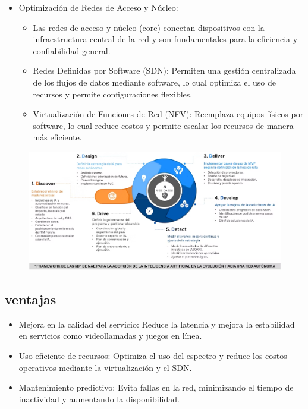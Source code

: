 \documentclass[12pt]{article}
\begin{document}
\begin{itemize}
    \item Optimización de Redes de Acceso y Núcleo:
    \begin{itemize}
        \item Las redes de acceso y núcleo (core) conectan dispositivos con la infraestructura central de la red y son fundamentales para la 
        eficiencia y confiabilidad general.
        \item Redes Definidas por Software (SDN): Permiten una gestión centralizada de los flujos de datos mediante software, lo cual 
        optimiza el uso de recursos y permite configuraciones flexibles.
        \item Virtualización de Funciones de Red (NFV): Reemplaza equipos físicos por software, lo cual reduce costos y permite escalar 
        los recursos de manera más eficiente.
    \end{itemize}

\end{itemize}

\begin{figure}[h!]
    \centering
    \includegraphics[width=.6\textwidth]{teleco.png}
    \label{fig:my_label}
\end{figure}

\subsection{ventajas}
\begin{itemize}
    \item Mejora en la calidad del servicio: 
    Reduce la latencia y mejora la estabilidad en servicios como videollamadas y juegos en línea.
    \item Uso eficiente de recursos: 
    Optimiza el uso del espectro y reduce los costos operativos mediante la virtualización y el SDN.
    \item Mantenimiento predictivo: 
    Evita fallas en la red, minimizando el tiempo de inactividad y aumentando la disponibilidad.
\end{itemize}
\end{document}
